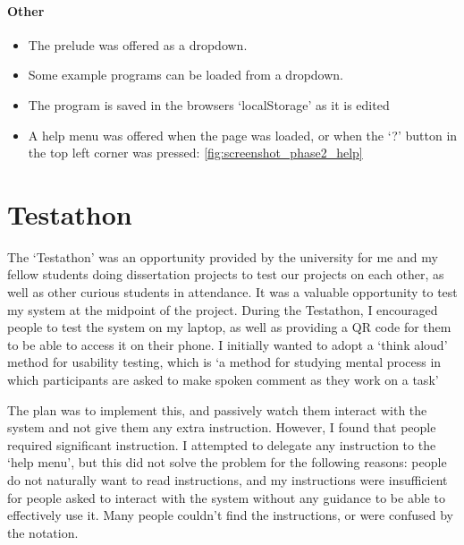 \paragraph{Other}

\begin{itemize}
    \item The prelude was offered as a dropdown.
    \item Some example programs can be loaded from a dropdown.  
    \item The program is saved in the browsers `localStorage' as it is edited
    \item A help menu was offered when the page was loaded, or when the `?' button in the top left corner was pressed: \ref{fig:screenshot_phase2_help}
\end{itemize}

\section{Testathon}
\label{c2:testathon}
The `Testathon' was an opportunity provided by the university for me and my fellow students doing dissertation projects to test our projects on each other, as well as other curious students in attendance. It was a valuable opportunity to test my system at the midpoint of the project. During the Testathon, I encouraged people to test the system on my laptop, as well as providing a QR code for them to be able to access it on their phone. I initially wanted to adopt a `think aloud' method for usability testing, which is `a method for studying mental process in which participants are asked to make spoken comment as they work on a task'~\cite{thinkaloud}

The plan was to implement this, and passively watch them interact with the system and not give them any extra instruction. However, I found that people required significant instruction. I attempted to delegate any instruction to the `help menu', but this did not solve the problem for the following reasons: people do not naturally want to read instructions, and my instructions were insufficient for people asked to interact with the system without any guidance to be able to effectively use it. Many people couldn't find the instructions, or were confused by the notation.

